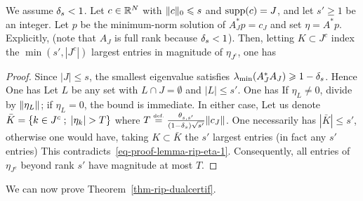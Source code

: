 \begin{lem}\label{lemma-rip-eta}
	We assume $\delta_s < 1$.	
	Let $c \in \mathbb{R}^N$ with $\lVert c\rVert_0 \leqslant s$ and $\operatorname{supp}(c)=J$, and let $s'\geq1$ be an integer.
	Let $p$ be the minimum-norm solution of $A_J^*p=c_J$ and set $\eta=A^*p$. Explicitly,
	(note that $A_J$ is full rank because $\delta_s<1$). Then, letting $K\subset J^c$ index the $\min(s',|J^c|)$ largest entries in magnitude of $\eta_{J^c}$, one has
\end{lem}
\begin{proof}
    Since $|J|\leq s$, the smallest eigenvalue satisfies $\lambda_{\min}(A_J^*A_J) \geqslant 1-\delta_s$. Hence
	One has
	Let $L$ be any set with $L \cap J = \emptyset$ and $|L| \leq s'$. 
	One has
    If $\eta_L\neq0$, divide by $\lVert\eta_L\rVert$; if $\eta_L=0$, the bound is immediate. In either case,
	Let us denote $\bar K = \enscond{ k \in J^c }{ |\eta_k|>T }$ where $T \stackrel{\mbox{\upshape\tiny def.}}{=} \frac{\theta_{s,s'}}{(1-\delta_s)\sqrt{s'}} \lVert c_J\rVert$. One necessarily has $|\bar K| \leq s'$, otherwise one would have, taking $K \subset \bar K$ the $s'$ largest entries (in fact any $s'$ entries) 
    This contradicts~\eqref{eq-proof-lemma-rip-eta-1}. Consequently, all entries of $\eta_{J^c}$ beyond rank $s'$ have magnitude at most $T$.
\end{proof}

We can now prove Theorem~\ref{thm-rip-dualcertif}.

